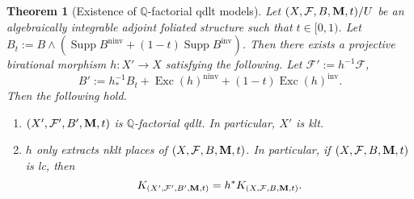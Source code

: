 \documentclass[12pt]{amsart}
\newcommand{\calum}[1]{{\textcolor{blue}{[Calum: #1]}}}
\numberwithin{equation}{section}
\newcommand{\Mm}{{\bf{M}}}
\newcommand{\Qq}{\mathbb{Q}}
\newcommand{\Exc}{\operatorname{Exc}}
\newcommand{\ninv}{\operatorname{ninv}}
\newcommand{\inv}{\operatorname{inv}}
\newcommand{\Supp}{\operatorname{Supp}}
\newcommand{\Ff}{\mathcal{F}}
\newtheorem{thm}{Theorem}[section]
\theoremstyle{definition}
\theoremstyle{definition}
\theoremstyle{definition}
\begin{document}
\begin{thm}[Existence of $\Qq$-factorial qdlt models]\label{thm: eoqdlt model}
    Let $(X,\Ff,B,\Mm,t)/U$ be an algebraically integrable adjoint foliated structure such that $t\in [0,1)$.
    Let $B_t:=B\wedge(\Supp B^{\ninv}+(1-t)\Supp B^{\inv})$. Then there exists a projective birational morphism $h: X'\rightarrow X$ satisfying the following. Let $\Ff':=h^{-1}\Ff$, $$B':=h^{-1}_*B_t+\Exc(h)^{\ninv}+(1-t)\Exc(h)^{\inv}.$$
    Then the following hold.
    \begin{enumerate}
    \item $(X',\Ff',B',\Mm,t)$ is $\Qq$-factorial qdlt. In particular, $X'$ is klt.
    \item $h$ only extracts nklt places of $(X,\Ff,B,\Mm,t)$. In particular, if $(X,\Ff,B,\Mm,t)$ is lc, then
    $$K_{(X',\Ff',B',\Mm,t)}=h^*K_{(X,\Ff,B,\Mm,t)}.$$
    \end{enumerate}
\end{thm}
\end{document}
